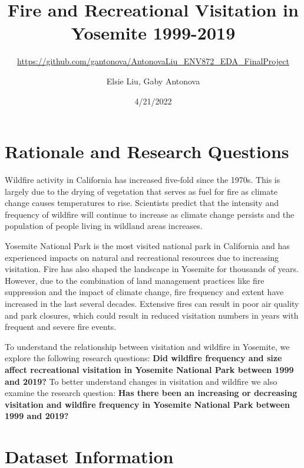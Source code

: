 \documentclass[
  12pt,
]{article}
\title{Fire and Recreational Visitation in Yosemite 1999-2019}
\subtitle{\url{https://github.com/gantonova/AntonovaLiu_ENV872_EDA_FinalProject}}
\author{Elsie Liu, Gaby Antonova}
\date{4/21/2022}
\begin{document}
\maketitle

{
\hypersetup{linkcolor=}
\setcounter{tocdepth}{2}
\tableofcontents
}
\newpage
\listoftables 
\newpage
\listoffigures 
\newpage

\hypertarget{rationale-and-research-questions}{%
\section{Rationale and Research Questions}\label{rationale-and-research-questions}}

Wildfire activity in California has increased five-fold since the 1970s. This is largely due to the drying of vegetation that serves as fuel for fire as climate change causes temperatures to rise. Scientists predict that the intensity and frequency of wildfire will continue to increase as climate change persists and the population of people living in wildland areas increases.

Yosemite National Park is the most visited national park in California and has experienced impacts on natural and recreational resources due to increasing visitation. Fire has also shaped the landscape in Yosemite for thousands of years. However, due to the combination of land management practices like fire suppression and the impact of climate change, fire frequency and extent have increased in the last several decades. Extensive fires can result in poor air quality and park closures, which could result in reduced visitation numbers in years with frequent and severe fire events.

To understand the relationship between visitation and wildfire in Yosemite, we explore the following research questions: \textbf{Did wildfire frequency and size affect recreational visitation in Yosemite National Park between 1999 and 2019?} To better understand changes in visitation and wildfire we also examine the research question: \textbf{Has there been an increasing or decreasing visitation and wildfire frequency in Yosemite National Park between 1999 and 2019?}

\newpage

\hypertarget{dataset-information}{%
\section{Dataset Information}\label{dataset-information}}
\end{document}
